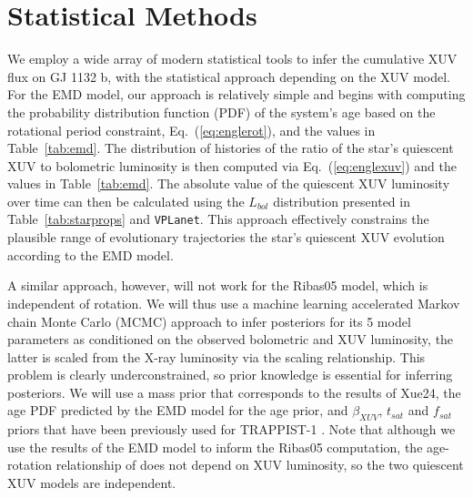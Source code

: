 \documentclass[preprint]{aastex631}
\def\vplanet{\texttt{\footnotesize{VPLanet}}\xspace}
\begin{document}



\section{Statistical Methods\label{sec:stats}}

We employ a wide array of modern statistical tools to infer the cumulative XUV flux on GJ 1132 b, with the statistical approach depending on the XUV model. For the EMD model, our approach is relatively simple and begins with computing the probability distribution function (PDF) of the system's age based on the rotational period constraint, Eq.~(\ref{eq:englerot}), and the values in Table~\ref{tab:emd}. The distribution of histories of the ratio of the star's quiescent XUV to bolometric luminosity is then computed via Eq.~(\ref{eq:englexuv}) and the values in Table~\ref{tab:emd}. The absolute value of the quiescent XUV luminosity over time can then be calculated using the $L_{bol}$ distribution presented in Table~\ref{tab:starprops} and \vplanet. This approach effectively constrains the plausible range of evolutionary trajectories the star's quiescent XUV evolution according to the EMD model.

A similar approach, however, will not work for the Ribas05 model, which is independent of rotation. We will thus use a machine learning accelerated Markov chain Monte Carlo (MCMC) approach to infer posteriors for its 5 model parameters as conditioned on the observed bolometric and XUV luminosity, the latter is scaled from the X-ray luminosity via the \citet{SanzForcada25} scaling relationship. This problem is clearly underconstrained, so prior knowledge is essential for inferring posteriors. We will use a mass prior that corresponds to the results of Xue24, the age PDF predicted by the EMD model for the age prior, and $\beta_{XUV}$, $t_{sat}$ and $f_{sat}$ priors that have been previously used for TRAPPIST-1 \citep{Fleming20,Birky21}. Note that although we use the results of the EMD model to inform the Ribas05 computation, the age-rotation relationship of \citet{EngleGuinan23} does not depend on XUV luminosity, so the two quiescent XUV models are independent. 
\end{document}
